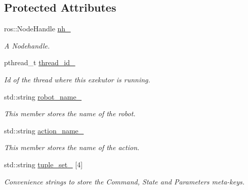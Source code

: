 \subsection*{\-Protected \-Attributes}
\begin{DoxyCompactItemize}
\item 
ros\-::\-Node\-Handle \hyperlink{classexekutor_1_1ActionExekutor_a1f0541608c4f27f3c72ab22b1874c882}{nh\-\_\-}
\begin{DoxyCompactList}\small\item\em \-A \-Nodehandle. \end{DoxyCompactList}\item 
pthread\-\_\-t \hyperlink{classexekutor_1_1ActionExekutor_a8d7e748c6d705da31eea62af6723ebca}{thread\-\_\-id\-\_\-}
\begin{DoxyCompactList}\small\item\em \-Id of the thread where this exekutor is running. \end{DoxyCompactList}\item 
std\-::string \hyperlink{classexekutor_1_1ActionExekutor_af165894bbbbabd62c17be857be095936}{robot\-\_\-name\-\_\-}
\begin{DoxyCompactList}\small\item\em \-This member stores the name of the robot. \end{DoxyCompactList}\item 
std\-::string \hyperlink{classexekutor_1_1ActionExekutor_ad0ab1bb7a2575962ee5fc9e2150c5d50}{action\-\_\-name\-\_\-}
\begin{DoxyCompactList}\small\item\em \-This member stores the name of the action. \end{DoxyCompactList}\item 
std\-::string \hyperlink{classexekutor_1_1ActionExekutor_a22f5cde3fe83eb147ec50c2d760b2d1f}{tuple\-\_\-set\-\_\-} \mbox{[}4\mbox{]}
\begin{DoxyCompactList}\small\item\em \-Convenience strings to store the \-Command, \-State and \-Parameters meta-\/keys. \end{DoxyCompactList}\end{DoxyCompactItemize}
